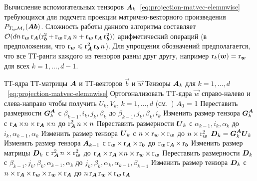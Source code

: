 \begin{algorithm}[tb]
   \caption{Вычисление вспомогательных тензоров $\boldsymbol{A}_k$~\eqref{eq:projection-matvec-elemnwise} требующихся для подсчета проекции матрично-векторного произведения $P_{T_{\boldsymbol{w}} \mathcal{M}_{\operatorname{r}}} (\boldsymbol{A}\boldsymbol{b})$. Сложность работы данного алгоритма составляет $\mathcal{O}(d n \operatorname{r}_{\boldsymbol{w}} \operatorname{r}_{\boldsymbol{A}}  (\operatorname{r}^2_{\boldsymbol{b}} + \operatorname{r}_{\boldsymbol{w}} \operatorname{r}_{\boldsymbol{A}} n + \operatorname{r}_{\boldsymbol{w}} \operatorname{r}_{\boldsymbol{A}} \operatorname{r}^2_{\boldsymbol{b}}))$ арифметический операций (в предположении, что $\operatorname{r}_{\boldsymbol{w}} \leqslant \operatorname{r}^2_{\boldsymbol{A}} \operatorname{r}_{\boldsymbol{b}} n$). Для упрощения обозначений предполагается, что все ТТ-ранги каждого из тензоров равны друг другу, например $\operatorname{r}_k(\boldsymbol{w}) = \operatorname{r}_{\boldsymbol{w}}$ для всех $k = 1, \ldots, d-1$.}
   \label{alg:project-matvec}
\begin{algorithmic}[1]
   \REQUIRE ТТ-ядра ТТ-матрицы $\boldsymbol{A}$ и ТТ-векторов $\vec{b}$ и $\vec{w}$
   \ENSURE Тензоры  $\boldsymbol{A}_k$ для $k=1,\ldots,d$~\eqref{eq:projection-matvec-elemnwise}
   \STATE Ортогонализовать TT-ядра $\vec{w}$ справо-налево и слева-направо чтобы получить $U_k, V_k$, $k=1, \ldots, d$ (см.~\cite{oseledets2011ttMain})
   \STATE $A_0$ = 1
   \STATE Переставить размерности $\boldsymbol{G}_k^{\boldsymbol{A}}$ с $\beta_{k-1}, i_k, j_k, \beta_{k}$ до $\beta_{k-1}, j_k, \beta_{k}, i_k$
   \STATE Изменить размер тензора $\boldsymbol{G}_k^{\boldsymbol{A}}$ с $\operatorname{r}_{\boldsymbol{A}} \times n \times \operatorname{r}_{\boldsymbol{A}} \times n$ до $\operatorname{r}^2_{\boldsymbol{A}}n \times n$
   \STATE Переставить размерности $\boldsymbol{U}_k$ с $\alpha_{k-1}, i_k, \alpha_{k}$ до $i_k, \alpha_{k-1}, \alpha_{k}$
   \STATE Изменить размер тензора $\boldsymbol{U}_k$ с $n \times \operatorname{r}_{\boldsymbol{w}} \times \operatorname{r}_{\boldsymbol{w}}$ до $n \times \operatorname{r}^2_{\boldsymbol{w}}$
   \STATE $\boldsymbol{D}_k = \boldsymbol{G}_k^{\boldsymbol{A}} \boldsymbol{U}_k$ 
   \STATE Изменить размер тензора $\boldsymbol{A}_{k-1}$ с $\operatorname{r}_{\boldsymbol{w}} \times \operatorname{r}_{\boldsymbol{A}} \times \operatorname{r}_{\boldsymbol{b}}$ до $\operatorname{r}_{\boldsymbol{w}} \operatorname{r}_{\boldsymbol{A}} \times \operatorname{r}_{\boldsymbol{b}}$
   \STATE Изменить размер матрицы $\boldsymbol{D}_k$ с $\operatorname{r}^2_{\boldsymbol{A}}n \times \operatorname{r}^2_{\boldsymbol{w}}$ до $\operatorname{r}_{\boldsymbol{A}} \times \operatorname{r}_{\boldsymbol{A}} \times n \times \operatorname{r}_{\boldsymbol{w}} \times \operatorname{r}_{\boldsymbol{w}}$
   \STATE Переставить размерности $\boldsymbol{D}_k$ с $\beta_{k-1}, j_k, \beta_{k}, \alpha_{k-1}, \alpha_{k}$ до $j_k, \beta_{k}, \alpha_{k}, \alpha_{k-1},\beta_{k-1}$
   \STATE Изменить размер тензора $\boldsymbol{D}_k$ с $n \times \operatorname{r}_{\boldsymbol{A}} \times \operatorname{r}_{\boldsymbol{w}} \times \operatorname{r}_{\boldsymbol{w}} \times \operatorname{r}_{\boldsymbol{A}}$ до $n \operatorname{r}_{\boldsymbol{A}} \operatorname{r}_{\boldsymbol{w}} \times \operatorname{r}_{\boldsymbol{w}}  \operatorname{r}_{\boldsymbol{A}}$

\end{algorithmic}
\end{algorithm}
